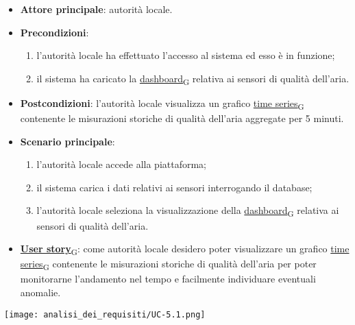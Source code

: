 \begin{itemize}
	\item \textbf{Attore principale}: autorità locale.
	\item \textbf{Precondizioni}:
	      \begin{enumerate}
		      \item l'autorità locale ha effettuato l'accesso al sistema ed esso è in funzione;
		      \item il sistema ha caricato la \href{https://7last.github.io/docs/pb/documentazione-interna/glossario\#dashboard}{dashboard\textsubscript{G}} relativa ai sensori di qualità dell'aria.
	      \end{enumerate}
	\item \textbf{Postcondizioni}: l'autorità locale visualizza un grafico \href{https://7last.github.io/docs/pb/documentazione-interna/glossario\#time-series}{time series\textsubscript{G}} contenente le misurazioni storiche
	      di qualità dell'aria aggregate per 5 minuti.
	\item \textbf{Scenario principale}:
	      \begin{enumerate}
		      \item l'autorità locale accede alla piattaforma;
		      \item il sistema carica i dati relativi ai sensori interrogando il database;
		      \item l'autorità locale seleziona la visualizzazione della \href{https://7last.github.io/docs/pb/documentazione-interna/glossario\#dashboard}{dashboard\textsubscript{G}} relativa ai sensori di qualità dell'aria.
	      \end{enumerate}
	\item \href{https://7last.github.io/docs/pb/documentazione-interna/glossario\#user-story}{\textbf{User story}\textsubscript{G}}:
	      come autorità locale desidero poter visualizzare un grafico \href{https://7last.github.io/docs/pb/documentazione-interna/glossario\#time-series}{time series\textsubscript{G}} contenente le misurazioni storiche
	      di qualità dell'aria per poter monitorarne l'andamento nel tempo e facilmente individuare eventuali anomalie.
\end{itemize}
\begin{center}
	\texttt{[image: analisi\_dei\_requisiti/UC-5.1.png]}
\end{center}


